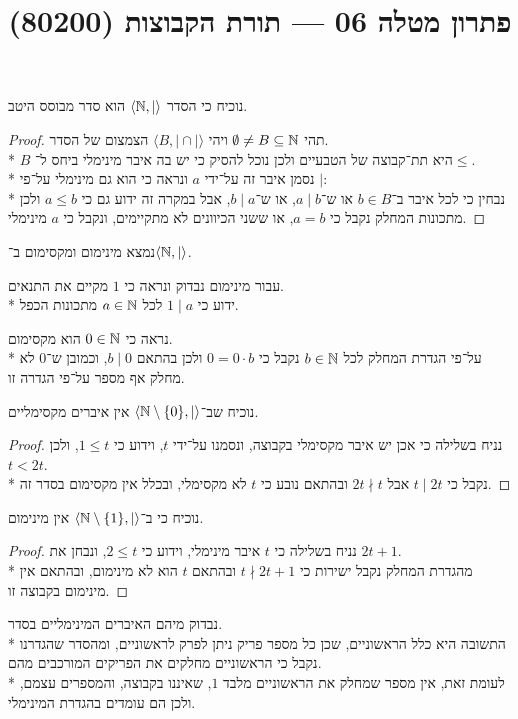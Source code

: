 
\title{פתרון מטלה 06 --- תורת הקבוצות (80200)}


\maketitle
\maketitleprint{}

\Question{}
\Subquestion{}
נוכיח כי הסדר $\langle \mathbb{N}, \mid \rangle$ הוא סדר מבוסס היטב.
\begin{proof}
	תהי $\emptyset \ne B \subseteq \mathbb{N}$ ויהי $\langle B, \mid \cap \mid \rangle$ הצמצום של הסדר. \\*
	$B$ היא תת־קבוצה של הטבעיים ולכן נוכל להסיק כי יש בה איבר מינימלי ביחס ל־$\le$. \\*
	נסמן איבר זה על־ידי $a$ ונראה כי הוא גם מינימלי על־פי $\mid$: \\*
	נבחין כי לכל איבר ב־$b \in B$ או ש־$a \mid b$, או ש־$b \mid a$, אבל במקרה זה ידוע גם כי $a \le b$ ולכן מתכונות המחלק נקבל כי $a = b$, או ששני הכיוונים לא מתקיימים, ונקבל כי $a$ מינימלי.
\end{proof}

\Subquestion{}
נמצא מינימום ומקסימום ב־$\langle \mathbb{N}, \mid \rangle$.

עבור מינימום נבדוק ונראה כי $1$ מקיים את התנאים. \\*
ידוע כי $1 \mid a$ לכל $a \in \mathbb{N}$ מתכונות הכפל.

נראה כי $0 \in \mathbb{N}$ הוא מקסימום. \\*
על־פי הגדרת המחלק לכל $b \in \mathbb{N}$ נקבל כי $0 = 0 \cdot b$ ולכן בהתאם $b \mid 0$, וכמובן ש־$0$ לא מחלק אף מספר על־פי הגדרה זו.
 
\Subquestion{}
נוכיח שב־$\langle \mathbb{N} \setminus \{ 0 \}, \mid \rangle$ אין איברים מקסימליים.
\begin{proof}
	נניח בשלילה כי אכן יש איבר מקסימלי בקבוצה, ונסמנו על־ידי $t$, וידוע כי $1 \le t$, ולכן $t < 2t$. \\*
	נקבל כי $t \mid 2t$ אבל $2t \nmid t$ ובהתאם נובע כי $t$ לא מקסימלי, ובכלל אין מקסימום בסדר זה.
\end{proof}

\Subquestion{}
נוכיח כי ב־$\langle \mathbb{N} \setminus \{ 1 \}, \mid \rangle$ אין מינימום.
\begin{proof}
	נניח בשלילה כי $t$ איבר מינימלי, וידוע כי $2 \le t$, ונבחן את $2t + 1$. \\*
	מהגדרת המחלק נקבל ישירות כי $t \nmid 2t + 1$ ובהתאם $t$ הוא לא מינימום, ובהתאם אין מינימום בקבוצה זו.
\end{proof}
נבדוק מיהם האיברים המינימליים בסדר. \\*
התשובה היא כלל הראשוניים, שכן כל מספר פריק ניתן לפרק לראשוניים, ומהסדר שהגדרנו נקבל כי הראשוניים מחלקים את הפריקים המורכבים מהם. \\*
לעומת זאת, אין מספר שמחלק את הראשוניים מלבד $1$, שאיננו בקבוצה, והמספרים עצמם, ולכן הם עומדים בהגדרת המינימלי.

